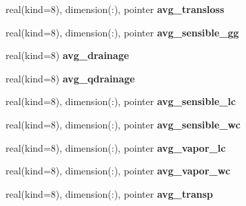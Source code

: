 \begin{DoxyCompactItemize}
\item 
\hypertarget{structrk4__coms_1_1rk4patchtype_a54106484b2f38629e63f1ef68bfdbbb9}{
real(kind=8), dimension(:), pointer {\bfseries avg\_\-transloss}}
\label{structrk4__coms_1_1rk4patchtype_a54106484b2f38629e63f1ef68bfdbbb9}

\item 
\hypertarget{structrk4__coms_1_1rk4patchtype_a46cce34c17ba768cc25fc1c7cf50d16e}{
real(kind=8), dimension(:), pointer {\bfseries avg\_\-sensible\_\-gg}}
\label{structrk4__coms_1_1rk4patchtype_a46cce34c17ba768cc25fc1c7cf50d16e}

\item 
\hypertarget{structrk4__coms_1_1rk4patchtype_a30dc13f12f5121cef922c5648964ae43}{
real(kind=8) {\bfseries avg\_\-drainage}}
\label{structrk4__coms_1_1rk4patchtype_a30dc13f12f5121cef922c5648964ae43}

\item 
\hypertarget{structrk4__coms_1_1rk4patchtype_a7554a3b598ac64fe8f649aa35bc38747}{
real(kind=8) {\bfseries avg\_\-qdrainage}}
\label{structrk4__coms_1_1rk4patchtype_a7554a3b598ac64fe8f649aa35bc38747}

\item 
\hypertarget{structrk4__coms_1_1rk4patchtype_a13d280da5f9a342e9ab6e2e8361b7b6f}{
real(kind=8), dimension(:), pointer {\bfseries avg\_\-sensible\_\-lc}}
\label{structrk4__coms_1_1rk4patchtype_a13d280da5f9a342e9ab6e2e8361b7b6f}

\item 
\hypertarget{structrk4__coms_1_1rk4patchtype_a0c2990c2a45db82332f6ea282b565213}{
real(kind=8), dimension(:), pointer {\bfseries avg\_\-sensible\_\-wc}}
\label{structrk4__coms_1_1rk4patchtype_a0c2990c2a45db82332f6ea282b565213}

\item 
\hypertarget{structrk4__coms_1_1rk4patchtype_a6f135766e73c42a5e86a86f388ab77bc}{
real(kind=8), dimension(:), pointer {\bfseries avg\_\-vapor\_\-lc}}
\label{structrk4__coms_1_1rk4patchtype_a6f135766e73c42a5e86a86f388ab77bc}

\item 
\hypertarget{structrk4__coms_1_1rk4patchtype_a8645e2037319bb7dbc5fc74bfe886e47}{
real(kind=8), dimension(:), pointer {\bfseries avg\_\-vapor\_\-wc}}
\label{structrk4__coms_1_1rk4patchtype_a8645e2037319bb7dbc5fc74bfe886e47}

\item 
\hypertarget{structrk4__coms_1_1rk4patchtype_ac2b135965e074e44a93f6d55c55fd7f6}{
real(kind=8), dimension(:), pointer {\bfseries avg\_\-transp}}
\label{structrk4__coms_1_1rk4patchtype_ac2b135965e074e44a93f6d55c55fd7f6}


\end{DoxyCompactItemize}
